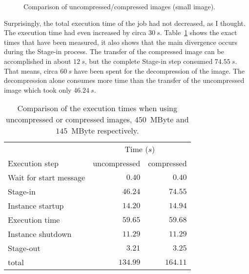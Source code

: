 \begin{figure}[ht]
  \label{fig:compression-comparison-small}
  \caption[Uncompressed   \vs  compressed   small   images]{Comparison  of
    uncompressed/compressed images (small image).}
\end{figure}

Surprisingly, the total execution time of  the job had not decreased, as I
thought.   The  execution  time  had  even increased  by  circa  $30\  s$.
Table~\ref{tab:compression-comparison-small}  shows the  exact  times that
have been measured,  it also shows that the  main divergence occurs during
the  Stage-in  process.  The  transfer  of  the  compressed image  can  be
accomplished in  about $12\  s$, but the  complete Stage-in  step consumed
$74.55\  s$.   That  means,  circa   $60\  s$  have  been  spent  for  the
decompression of  the image.  The  decompression alone consumes  more time
than the transfer of the uncompressed image which took only $46.24\ s$.

\begin{table}[ht]
  \centering
  \begin{tabular}{@{}lrr@{}}\toprule
                      & \multicolumn{2}{c}{Time ($s$)} \\ \cmidrule(lr){2-3}
    Execution step         &  uncompressed      & compressed \\ \midrule %
    Wait for start message &  $   0.40 $        & $   0.40 $    \\
    Stage-in               &  $  46.24 $        & $  74.55 $    \\
    Instance startup       &  $  14.20 $        & $  14.94 $    \\
    Execution time         &  $  59.65 $        & $  59.68 $    \\
    Instance shutdown      &  $  11.29 $        & $  11.29 $    \\
    Stage-out              &  $   3.21 $        & $   3.25 $    \\
    total                  &  $ 134.99 $        & $ 164.11 $    \\
    \bottomrule
  \end{tabular}
  \caption[Uncompressed \vs compressed small images]{Comparison of the execution times when using uncompressed or
    compressed images, $450$~MByte and $145$~MByte respectively.}
  \label{tab:compression-comparison-small}
\end{table}

